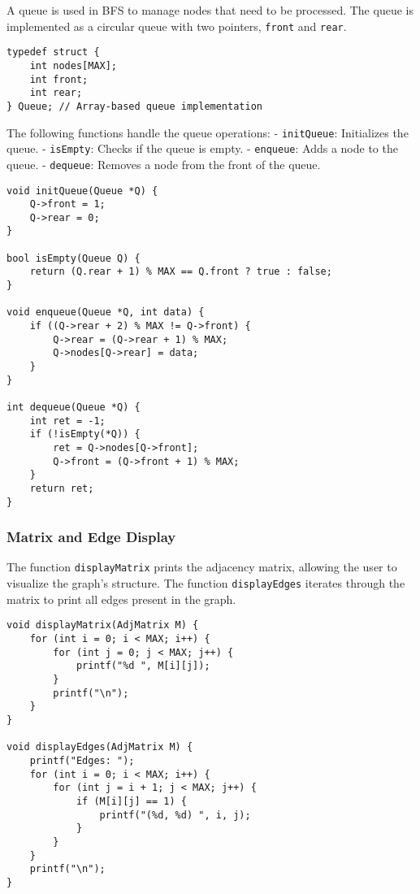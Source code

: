 \documentclass{book}
\begin{document}
A queue is used in BFS to manage nodes that need to be processed. The queue is implemented as a circular queue with two pointers, \texttt{front} and \texttt{rear}.

\begin{verbatim}
typedef struct {
    int nodes[MAX];
    int front;
    int rear;
} Queue; // Array-based queue implementation
\end{verbatim}

The following functions handle the queue operations:
- \texttt{initQueue}: Initializes the queue.
- \texttt{isEmpty}: Checks if the queue is empty.
- \texttt{enqueue}: Adds a node to the queue.
- \texttt{dequeue}: Removes a node from the front of the queue.

\begin{verbatim}
void initQueue(Queue *Q) {
    Q->front = 1;
    Q->rear = 0;
}

bool isEmpty(Queue Q) {
    return (Q.rear + 1) % MAX == Q.front ? true : false;
}

void enqueue(Queue *Q, int data) {
    if ((Q->rear + 2) % MAX != Q->front) {
        Q->rear = (Q->rear + 1) % MAX;
        Q->nodes[Q->rear] = data;
    }
}

int dequeue(Queue *Q) {
    int ret = -1;
    if (!isEmpty(*Q)) {
        ret = Q->nodes[Q->front];
        Q->front = (Q->front + 1) % MAX;
    }
    return ret;
}
\end{verbatim}

\subsubsection{Matrix and Edge Display}

The function \texttt{displayMatrix} prints the adjacency matrix, allowing the user to visualize the graph's structure. The function \texttt{displayEdges} iterates through the matrix to print all edges present in the graph.

\begin{verbatim}
void displayMatrix(AdjMatrix M) {
    for (int i = 0; i < MAX; i++) {
        for (int j = 0; j < MAX; j++) {
            printf("%d ", M[i][j]);
        }
        printf("\n");
    }
}

void displayEdges(AdjMatrix M) {
    printf("Edges: ");
    for (int i = 0; i < MAX; i++) {
        for (int j = i + 1; j < MAX; j++) {
            if (M[i][j] == 1) {
                printf("(%d, %d) ", i, j);
            }
        }
    }
    printf("\n");
}
\end{verbatim}
\end{document}
